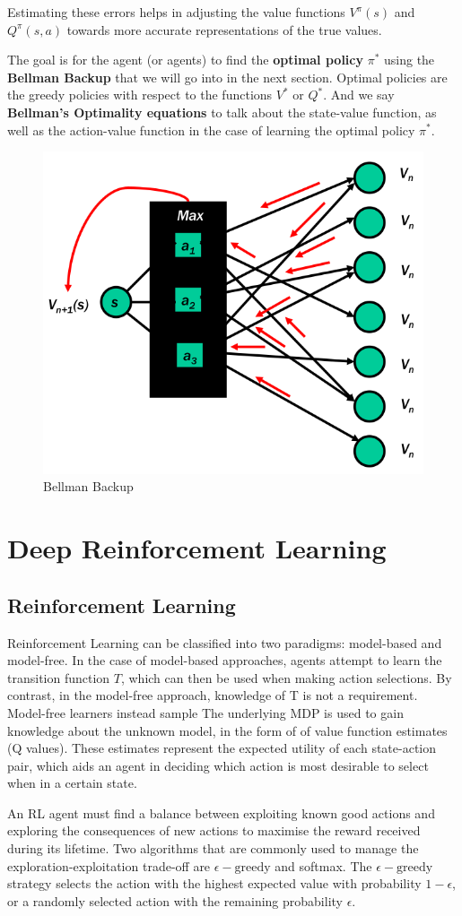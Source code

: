 Estimating these errors helps in adjusting the value functions \( V^{\pi}(s) \) and \( Q^{\pi}(s,a) \) towards more accurate representations of the true values.


The goal is for the agent (or agents) to find the \textbf{optimal policy} $\pi ^{*}$ using the \textbf{Bellman Backup} that we will go into in the next section. Optimal policies are the greedy policies with respect to the functions $V^{*}$ or $Q^{*}$. And we say \textbf{Bellman's Optimality equations} to talk about the state-value function, as well as the action-value function in the case of learning the optimal policy $\pi ^{*}$.
\begin{figure}[H]
    \centering
    \includegraphics[width=0.3\linewidth]{images_pfe/Screenshot from 2024-06-14 17-08-41.png}
    \caption{Bellman Backup}
    \label{fig:Bellman-Backup}
\end{figure}
\section{Deep Reinforcement Learning}
\subsection{Reinforcement Learning}
Reinforcement Learning can be classified into two paradigms: model-based and model-free. In the case of model-based approaches, agents attempt to learn the transition function $T$, which can then be used when making action selections. By contrast, in the model-free approach, knowledge of T is not a requirement. Model-free learners instead sample
The underlying MDP is used to gain knowledge about the unknown model, in the form of
of value function estimates (Q values). These estimates represent the expected utility of each
state-action pair, which aids an agent in deciding which action is most desirable to select when in
a certain state.

An RL agent must find a balance between exploiting known good actions and exploring
the consequences of new actions to maximise the reward received during its lifetime. Two algorithms that are commonly used to manage the exploration-exploitation trade-off are
$\epsilon - \text{greedy}$ and softmax. The $\epsilon - \text{greedy}$ strategy selects the action with the highest expected value with probability $1 − \epsilon $, or a randomly selected action with the remaining probability $\epsilon $.


